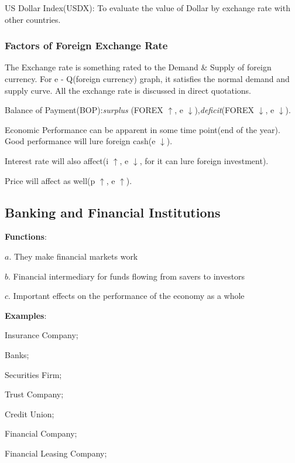\documentclass[10pt, a4paper]{article}
\begin{document}
            US Dollar Index(USDX): To evaluate the value of Dollar by exchange rate with other countries. 

            \subsubsection{Factors of Foreign Exchange Rate}
                The Exchange rate is something rated to the Demand \& Supply of foreign currency. For e - Q(foreign currency) graph, it satisfies the normal demand and supply curve. All the exchange rate is discussed in direct quotations. 

                Balance of Payment(BOP):\emph{surplus} (FOREX $\uparrow$, e $\downarrow$),\emph{deficit}(FOREX $\downarrow$, e $\downarrow$).
                
                Economic Performance can be apparent in some time point(end of the year). Good performance will lure foreign cash(e $\downarrow$).
                
                Interest rate will also affect(i $\uparrow$, e $\downarrow$, for it can lure foreign investment). 

                Price will affect as well(p $\uparrow$, e $\uparrow$).
    \subsection{Banking and Financial Institutions}
        \textbf{Functions}: 

            $a$. They make financial markets work 

            $b$. Financial intermediary for funds flowing from savers to investors

            $c$. Important effects on the performance of the economy as a whole
        
        \textbf{Examples}: 
            
            \quad Insurance Company; 
            
            \quad Banks; 
            
            \quad Securities Firm; 
            
            \quad Trust Company; 
            
            \quad Credit Union; 
            
            \quad Financial Company;
            
            \quad Financial Leasing Company;
            
\end{document}
